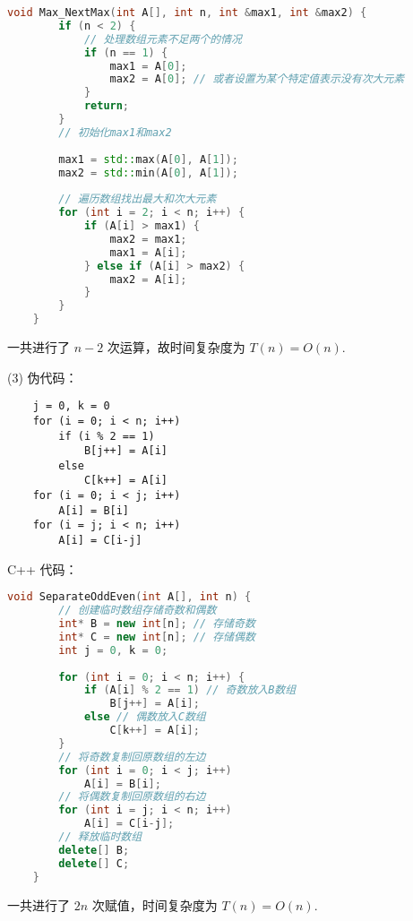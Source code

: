 \begin{lstlisting}[language=C++]
    void Max_NextMax(int A[], int n, int &max1, int &max2) {
        if (n < 2) {
            // 处理数组元素不足两个的情况
            if (n == 1) {
                max1 = A[0];
                max2 = A[0]; // 或者设置为某个特定值表示没有次大元素
            }
            return;
        }
        // 初始化max1和max2
    
        max1 = std::max(A[0], A[1]);
        max2 = std::min(A[0], A[1]);
    
        // 遍历数组找出最大和次大元素
        for (int i = 2; i < n; i++) {
            if (A[i] > max1) {
                max2 = max1;
                max1 = A[i];
            } else if (A[i] > max2) {
                max2 = A[i];
            }
        }
    }
    \end{lstlisting}
一共进行了 $n-2$ 次运算，故时间复杂度为 $T(n)=O(n)$.

(3)
伪代码：

\begin{lstlisting}
    j = 0, k = 0
    for (i = 0; i < n; i++)
        if (i % 2 == 1)
            B[j++] = A[i]
        else
            C[k++] = A[i]
    for (i = 0; i < j; i++)
        A[i] = B[i]
    for (i = j; i < n; i++)
        A[i] = C[i-j]
    \end{lstlisting}
C++ 代码：

\begin{lstlisting}[language=C++]
    void SeparateOddEven(int A[], int n) {
        // 创建临时数组存储奇数和偶数
        int* B = new int[n]; // 存储奇数
        int* C = new int[n]; // 存储偶数
        int j = 0, k = 0;
    
        for (int i = 0; i < n; i++) {
            if (A[i] % 2 == 1) // 奇数放入B数组
                B[j++] = A[i];
            else // 偶数放入C数组
                C[k++] = A[i];
        }
        // 将奇数复制回原数组的左边
        for (int i = 0; i < j; i++)
            A[i] = B[i];
        // 将偶数复制回原数组的右边
        for (int i = j; i < n; i++)
            A[i] = C[i-j];
        // 释放临时数组
        delete[] B;
        delete[] C;
    }
    \end{lstlisting}
一共进行了 $2n$ 次赋值，时间复杂度为 $T(n)=O(n)$.
